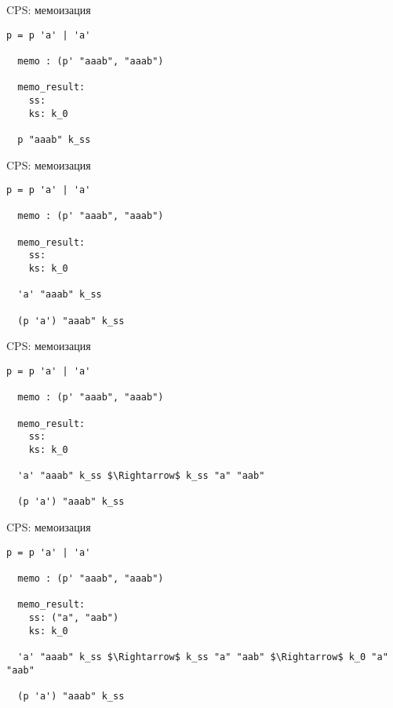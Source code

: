 \documentclass[10pt, mathserif]{beamer}
\theoremstyle{definition}
\begin{document}
\begin{frame}[fragile]{CPS: мемоизация}

\begin{lstlisting}[basicstyle=\small]
  p = p 'a' | 'a'

  memo : (p' "aaab", "aaab")

  memo_result:
    ss:
    ks: k_0

  p "aaab" k_ss
\end{lstlisting}

\end{frame}

\begin{frame}[fragile]{CPS: мемоизация}

\begin{lstlisting}[basicstyle=\small]
  p = p 'a' | 'a'

  memo : (p' "aaab", "aaab")

  memo_result:
    ss:
    ks: k_0

  'a' "aaab" k_ss

  (p 'a') "aaab" k_ss
\end{lstlisting}

\end{frame}

\begin{frame}[fragile]{CPS: мемоизация}

\begin{lstlisting}[basicstyle=\small]
  p = p 'a' | 'a'

  memo : (p' "aaab", "aaab")

  memo_result:
    ss:
    ks: k_0

  'a' "aaab" k_ss $\Rightarrow$ k_ss "a" "aab"

  (p 'a') "aaab" k_ss
\end{lstlisting}

\end{frame}

\begin{frame}[fragile]{CPS: мемоизация}

\begin{lstlisting}[basicstyle=\small]
  p = p 'a' | 'a'

  memo : (p' "aaab", "aaab")

  memo_result:
    ss: ("a", "aab")
    ks: k_0

  'a' "aaab" k_ss $\Rightarrow$ k_ss "a" "aab" $\Rightarrow$ k_0 "a" "aab"

  (p 'a') "aaab" k_ss
\end{lstlisting}

\end{frame}
\end{document}
